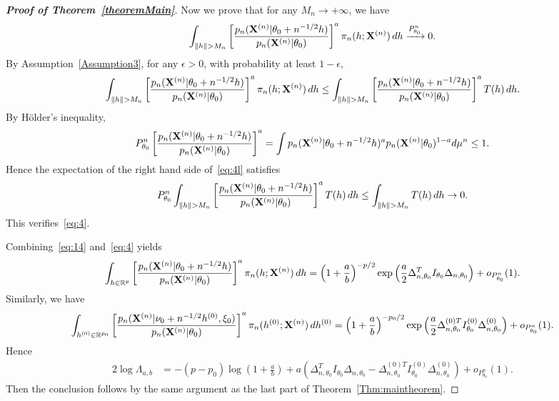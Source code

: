 \documentclass[11pt]{article}
\theoremstyle{plain}
\theoremstyle{definition}
\theoremstyle{remark}
\begin{document}
\begin{appendices}
\begin{proof}[\textbf{Proof of Theorem~\ref{theoremMain}}]
Now we prove that for any $M_n\to +\infty$, we have
\begin{equation}\label{eq:4}
    \int_{\|h\|> M_n}\left[\frac{p_n(\BX^{(n)}|\theta_0+n^{-1/2}h)}{p_n(\BX^{(n)}|\theta_0)}\right]^{a} \pi_n(h;\BX^{(n)})\, dh
    \xrightarrow{P_{\theta_0}^n}0.
\end{equation}
By Assumption~\ref{Assumption3}, for any $\epsilon>0$, with probability at least $1-\epsilon$,
\begin{equation}\label{eq:4l}
    \int_{\|h\|> M_n}\left[\frac{p_n(\BX^{(n)}|\theta_0+n^{-1/2}h)}{p_n(\BX^{(n)}|\theta_0)}\right]^{a} \pi_n(h;\BX^{(n)})\, dh
    \leq
    \int_{\|h\|> M_n}\left[\frac{p_n(\BX^{(n)}|\theta_0+n^{-1/2}h)}{p_n(\BX^{(n)}|\theta_0)}\right]^{a} T(h)\, dh.
\end{equation}
By  H\"older's inequality, 
\begin{equation*}
    P^n_{\theta_0}\left[\frac{p_n(\mathbf{X}^{(n)}|\theta_0+n^{-1/2}h)}{p_n(\mathbf{X}^{(n)}|\theta_0)}\right]^{a}
    =
    \int p_n(\mathbf{X}^{(n)}|\theta_0+n^{-1/2}h)^a p_n(\mathbf{X}^{(n)}|\theta_0)^{1-a} d\mu^n\leq 1.
\end{equation*}
Hence the expectation of the right hand side of~\eqref{eq:4l} satisfies
\begin{equation*}
   P^n_{\theta_0} \int_{\|h\|> M_n}\left[\frac{p_n(\BX^{(n)}|\theta_0+n^{-1/2}h)}{p_n(\BX^{(n)}|\theta_0)}\right]^{a} T(h)\, dh
   \leq
   \int_{\|h\|> M_n} T(h)\, dh\to 0.
\end{equation*}
This verifies~\eqref{eq:4}.

Combining~\eqref{eq:14} and~\eqref{eq:4} yields
\begin{equation*}
    \int_{h\in\mathbb{R}^p} \left[ \frac{p_n(\mathbf{X}^{(n)}|\theta_0+n^{-1/2}h)}{p_n(\mathbf{X}^{(n)}|\theta_0)}\right]^a \pi_n (h;\mathbf{X}^{(n)}) \, dh
    =\left(1+\frac{a}{b}\right)^{-p/2} \exp\left(\frac{a}{2}\Delta_{n,\theta_0}^T I_{\theta_0}\Delta_{n,\theta_0}\right)+o_{P_{\theta_0}^n}(1).
\end{equation*}
Similarly, we have
\begin{equation*}
    \int_{h^{(0)}\in\mathbb{R}^{p_0}} \left[ \frac{p_n(\mathbf{X}^{(n)}|\nu_0+n^{-1/2}h^{(0)},\xi_0)}{p_n(\mathbf{X}^{(n)}|\theta_0)}\right]^a \pi_n (h^{(0)};\mathbf{X}^{(n)}) \, dh^{(0)}
    =\left(1+\frac{a}{b}\right)^{-p_0/2} \exp\left(\frac{a}{2}\Delta_{n,\theta_0}^{(0)T} I^{(0)}_{\theta_0}\Delta^{(0)}_{n,\theta_0}\right)+o_{P_{\theta_0}^n}(1).
\end{equation*}
Hence
\begin{equation*}
    \begin{aligned} 
        2\log \Lambda_{a,b}&=
        -{(p-p_0)}\log (1+\frac{a}{b})+{a}\left(
\Delta_{n,\theta_0}^T I_{\theta_0}\Delta_{n,\theta_0}
        -\Delta_{n,\theta_0}^{(0)T} I^{(0)}_{\theta_0}\Delta^{(0)}_{n,\theta_0}\right)
        +o_{P^n_{\theta_0}}(1).
    \end{aligned}
\end{equation*}
Then the conclusion follows by the same argument as the last part of Theorem~\ref{Thm:maintheorem}.
\end{proof}


\end{appendices}
\end{document}
